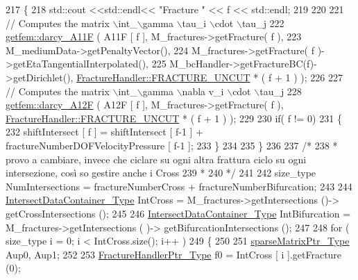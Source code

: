 \begin{DoxyCode}
217     \{
218         std::cout <<std::endl<< \textcolor{stringliteral}{"Fracture "} << f << std::endl;
219 
220         
221         \textcolor{comment}{// Computes the matrix \(\backslash\)int\_\(\backslash\)gamma \(\backslash\)tau\_i \(\backslash\)cdot \(\backslash\)tau\_j}
222         \hyperlink{namespacegetfem_aba6f1b4f1d395aae3d96071cad4953a2}{getfem::darcy\_A11F} ( A11F [ f ], M\_fractures->getFracture( f ),
223                              M\_mediumData->getPenaltyVector(),
224                              M\_fractures->getFracture( f )->getEtaTangentialInterpolated(),
225                              M\_bcHandler->getFractureBC(f)->getDirichlet(), 
      \hyperlink{classFractureHandler_a495ad4fc72d0c47c8f0424842f1153aaaa992cc3ad024a030ecd798dc319c95ac}{FractureHandler::FRACTURE\_UNCUT} * ( f + 1 ) );
226 
227         \textcolor{comment}{// Computes the matrix \(\backslash\)int\_\(\backslash\)gamma \(\backslash\)nabla v\_i \(\backslash\)cdot \(\backslash\)tau\_j}
228         \hyperlink{namespacegetfem_ab62aa98cfcf55810e1518906202cbedc}{getfem::darcy\_A12F} ( A12F [ f ], M\_fractures->getFracture( f ), 
      \hyperlink{classFractureHandler_a495ad4fc72d0c47c8f0424842f1153aaaa992cc3ad024a030ecd798dc319c95ac}{FractureHandler::FRACTURE\_UNCUT} * ( f + 1 ) );
229         
230         \textcolor{keywordflow}{if}( f != 0)
231         \{
232             shiftIntersect [ f ] = shiftIntersect [ f-1 ] + fractureNumberDOFVelocityPressure [ f-1 ];  
233         \}
234         
235       \}
236     
237     \textcolor{comment}{/*}
238 \textcolor{comment}{     * provo a cambiare, invece che ciclare su ogni altra frattura ciclo su ogni intersezione, così so
       gestire anche i Cross}
239 \textcolor{comment}{     * }
240 \textcolor{comment}{     */}
241     
242     size\_type NumIntersections = fractureNumberCross + fractureNumberBifurcation;
243   
244     \hyperlink{IntersectData_8h_a822ec3b760dfb603e1cf0bfe3ad5636a}{IntersectDataContainer\_Type} IntCross = M\_fractures->getIntersections ()-> 
      getCrossIntersections ();
245     
246     \hyperlink{IntersectData_8h_a822ec3b760dfb603e1cf0bfe3ad5636a}{IntersectDataContainer\_Type} IntBifurcation = M\_fractures->getIntersections (
      )-> getBifurcationIntersections ();
247             
248     \textcolor{keywordflow}{for} ( size\_type i = 0; i < IntCross.size(); i++ )
249     \{
250         
251         \hyperlink{Core_8h_a87137a9501b38c724ac80bc955164bb7}{sparseMatrixPtr\_Type} Aup0, Aup1;
252             
253         \hyperlink{FractureHandler_8h_af23fb7a30aaff864bd42587af4f1e78a}{FractureHandlerPtr\_Type} f0 = IntCross [ i ].getFracture (0);

\end{DoxyCode}

